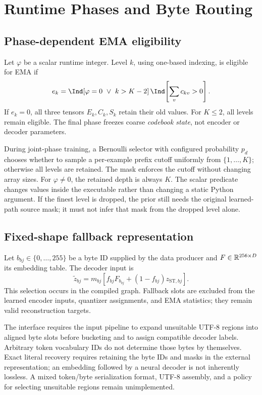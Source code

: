 \documentclass[11pt,a4paper]{article}
\begin{document}
\section{Runtime Phases and Byte Routing}
\subsection{Phase-dependent EMA eligibility}
Let \(\varphi\) be a scalar runtime integer. Level \(k\), using one-based indexing,
is eligible for EMA if
\begin{equation}
 e_k=\Ind[\varphi=0\ \lor\ k>K-2]\,
     \Ind\!\left[\sum_v c_{kv}>0\right].
\end{equation}
If \(e_k=0\), all three tensors \(E_k,C_k,S_k\) retain their old values.
For \(K\leq2\), all levels remain eligible. The final phase freezes coarse
\emph{codebook state}, not encoder or decoder parameters.

During joint-phase training, a Bernoulli selector with configured probability
\(p_d\) chooses whether to sample a per-example prefix cutoff uniformly from
\(\{1,\ldots,K\}\); otherwise all levels are retained. The mask enforces the
cutoff without changing array sizes. For \(\varphi\ne0\), the retained depth is
always \(K\). The scalar predicate changes values inside the executable rather
than changing a static Python argument. If the finest level is dropped, the
prior still needs the original learned-path source mask; it must not infer
that mask from the dropped level alone.

\subsection{Fixed-shape fallback representation}
\label{sec:fallback}
Let \(b_{bj}\in\{0,\ldots,255\}\) be a byte ID supplied by the data producer
and \(F\in\mathbb{R}^{256\times D}\) its embedding table. The decoder input is
\begin{equation}
 \widetilde z_{bj}=m_{bj}\left[
    f_{bj}F_{b_{bj}}+(1-f_{bj})z_{\mathrm{ST},bj}\right].
\end{equation}
This selection occurs in the compiled graph. Fallback slots are excluded from
the learned encoder inputs, quantizer assignments, and EMA statistics; they
remain valid reconstruction targets.

The interface requires the input pipeline to expand unsuitable UTF-8 regions
into aligned byte slots before bucketing and to assign compatible decoder
labels. Arbitrary token vocabulary IDs do not determine those bytes by
themselves. Exact literal recovery requires retaining the byte IDs and masks
in the external representation; an embedding followed by a neural decoder is
not inherently lossless. A mixed token/byte serialization format, UTF-8 assembly,
and a policy for selecting unsuitable regions remain unimplemented.
\end{document}
